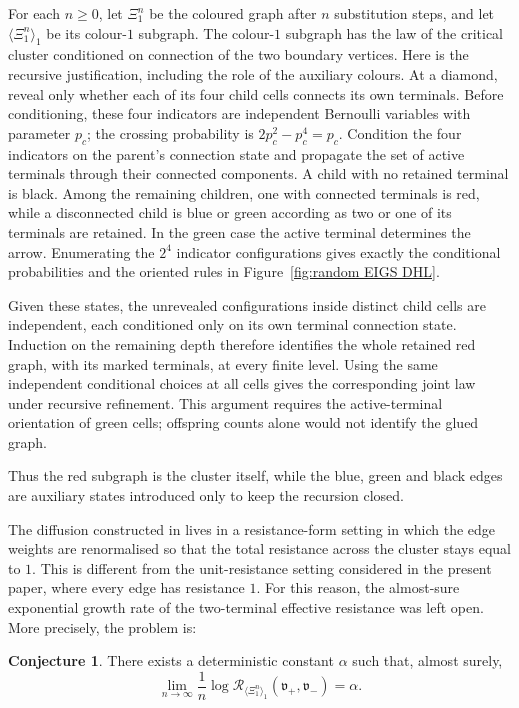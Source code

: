 \documentclass{article}
\theoremstyle{plain}
\theoremstyle{definition}
\newtheorem{conjecture}[theorem]{Conjecture}
\newcommand{\Reff}{\mathscr{R}}
\begin{document}
For each $n\ge 0$, let $\Xi_1^n$ be the coloured graph after $n$ substitution steps, and let $\langle \Xi_1^n\rangle_1$ be its colour-$1$ subgraph.
\begingroup\color{red}
The colour-$1$ subgraph has the law of the critical cluster conditioned
on connection of the two boundary vertices. Here is the recursive
justification, including the role of the auxiliary colours.
At a diamond, reveal only whether each of its four child cells connects
its own terminals. Before conditioning, these four indicators are
independent Bernoulli variables with parameter $p_c$; the crossing
probability is $2p_c^2-p_c^4=p_c$.
Condition the four indicators on the parent's connection state and
propagate the set of active terminals through their connected components.
A child with no retained terminal is black. Among the remaining children,
one with connected terminals is red, while a disconnected child is blue
or green according as two or one of its terminals are retained.
In the green case the active terminal determines the arrow.
Enumerating the $2^4$ indicator configurations gives exactly
the conditional probabilities and the oriented rules in
Figure~\ref{fig:random EIGS DHL}.

Given these states, the unrevealed configurations inside distinct child
cells are independent, each conditioned only on its own terminal
connection state. Induction on the remaining depth therefore identifies
the whole retained red graph, with its marked terminals, at every finite
level. Using the same independent conditional choices at all cells gives
the corresponding joint law under recursive refinement. This argument
requires the active-terminal orientation of green cells; offspring counts
alone would not identify the glued graph.
\endgroup{}

Thus the red subgraph is the cluster itself, while the blue, green and black edges are auxiliary states introduced only to keep the recursion closed.




The diffusion constructed in \cite{hambly2010diffusion} lives in a resistance-form setting in which the edge weights are renormalised so that the total resistance across the cluster stays equal to $1$.
This is different from the unit-resistance setting considered in the present paper, where every edge has resistance $1$.
For this reason, the almost-sure exponential growth rate of the two-terminal effective resistance was left open.
More precisely, the problem is:
\begin{conjecture}
There exists a deterministic constant $\alpha$ such that, almost surely,
\[
\lim_{n\to\infty}\frac{1}{n}\log \Reff_{\langle \Xi_1^n\rangle_1}(\mathfrak v_+,\mathfrak v_-)=\alpha.
\]
\end{conjecture}
\end{document}

